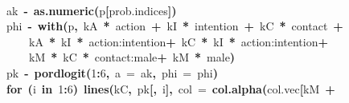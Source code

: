 \documentclass{article}
\makeatletter
\newcommand{\hlnumber}[1]{\textcolor[rgb]{0,0,0}{#1}}%
\newcommand{\hlfunctioncall}[1]{\textcolor[rgb]{.5,0,.33}{\textbf{#1}}}%
\newcommand{\hlkeyword}[1]{\textbf{#1}}%
\newcommand{\hlargument}[1]{\textcolor[rgb]{.69,.25,.02}{#1}}%
\newcommand{\hlassignement}[1]{\textbf{#1}}%
\newcommand{\hlsymbol}[1]{#1}%
\newcommand{\hlstd}[1]{\textcolor[rgb]{0,0,0}{#1}}%
\newenvironment{kframe}{%
 \def\FrameCommand##1{\hskip\@totalleftmargin \hskip-\fboxsep
 \colorbox{shadecolor}{##1}\hskip-\fboxsep
     \hskip-\linewidth \hskip-\@totalleftmargin \hskip\columnwidth}%
 \MakeFramed {\advance\hsize-\width
   \@totalleftmargin\z@ \linewidth\hsize
   \@setminipage}}%
 {\par\unskip\endMakeFramed}
\newenvironment{knitrout}{}{} %
\makeatother
\begin{document}
\begin{knitrout}
{\begin{kframe}
\begin{flushleft}
\hlstd{}\hspace*{\fill}\\
\hlstd{}{\ }{\ }{\ }{\ }{\ }{\ }{\ }{\ }\hlsymbol{ak}{\ }\hlassignement{\usebox{\hlnormalsizeboxlessthan}-}{\ }\hlfunctioncall{as.numeric}\hlkeyword{(}\hlsymbol{p}\hlkeyword{[}\hlsymbol{prob.indices}\hlkeyword{]}\hlkeyword{)}\hspace*{\fill}\\
\hlstd{}{\ }{\ }{\ }{\ }{\ }{\ }{\ }{\ }\hlsymbol{phi}{\ }\hlassignement{\usebox{\hlnormalsizeboxlessthan}-}{\ }\hlfunctioncall{with}\hlkeyword{(}\hlsymbol{p}\hlkeyword{,}{\ }\hlsymbol{kA}{\ }\hlkeyword{*}{\ }\hlsymbol{action}{\ }\hlkeyword{+}{\ }\hlsymbol{kI}{\ }\hlkeyword{*}{\ }\hlsymbol{intention}{\ }\hlkeyword{+}{\ }\hlsymbol{kC}{\ }\hlkeyword{*}{\ }\hlsymbol{contact}{\ }\hlkeyword{+}\hspace*{\fill}\\
\hlstd{}{\ }{\ }{\ }{\ }{\ }{\ }{\ }{\ }{\ }{\ }{\ }{\ }\hlsymbol{kA}{\ }\hlkeyword{*}{\ }\hlsymbol{kI}{\ }\hlkeyword{*}{\ }\hlsymbol{\usebox{\hlnormalsizeboxbacktick}action:intention\usebox{\hlnormalsizeboxbacktick}}{\ }\hlkeyword{+}{\ }\hlsymbol{kC}{\ }\hlkeyword{*}{\ }\hlsymbol{kI}{\ }\hlkeyword{*}{\ }\hlsymbol{\usebox{\hlnormalsizeboxbacktick}action:intention\usebox{\hlnormalsizeboxbacktick}}{\ }\hlkeyword{+}\hspace*{\fill}\\
\hlstd{}{\ }{\ }{\ }{\ }{\ }{\ }{\ }{\ }{\ }{\ }{\ }{\ }\hlsymbol{kM}{\ }\hlkeyword{*}{\ }\hlsymbol{kC}{\ }\hlkeyword{*}{\ }\hlsymbol{\usebox{\hlnormalsizeboxbacktick}contact:male\usebox{\hlnormalsizeboxbacktick}}{\ }\hlkeyword{+}{\ }\hlsymbol{kM}{\ }\hlkeyword{*}{\ }\hlsymbol{male}\hlkeyword{)}\hspace*{\fill}\\
\hlstd{}{\ }{\ }{\ }{\ }{\ }{\ }{\ }{\ }\hlsymbol{pk}{\ }\hlassignement{\usebox{\hlnormalsizeboxlessthan}-}{\ }\hlfunctioncall{pordlogit}\hlkeyword{(}\hlnumber{1}\hlkeyword{:}\hlnumber{6}\hlkeyword{,}{\ }\hlargument{a}{\ }\hlargument{=}{\ }\hlsymbol{ak}\hlkeyword{,}{\ }\hlargument{phi}{\ }\hlargument{=}{\ }\hlsymbol{phi}\hlkeyword{)}\hspace*{\fill}\\
\hlstd{}{\ }{\ }{\ }{\ }{\ }{\ }{\ }{\ }\hlkeyword{for}{\ }\hlkeyword{(}\hlsymbol{i}{\ }\hlkeyword{in}{\ }\hlnumber{1}\hlkeyword{:}\hlnumber{6}\hlkeyword{)}{\ }\hlfunctioncall{lines}\hlkeyword{(}\hlsymbol{kC}\hlkeyword{,}{\ }\hlsymbol{pk}\hlkeyword{[}\hlkeyword{,}{\ }\hlsymbol{i}\hlkeyword{]}\hlkeyword{,}{\ }\hlargument{col}{\ }\hlargument{=}{\ }\hlfunctioncall{col.alpha}\hlkeyword{(}\hlsymbol{col.vec}\hlkeyword{[}\hlsymbol{kM}{\ }\hlkeyword{+}\hspace*{\fill}\\

\end{flushleft}
\end{kframe}}
\end{knitrout}
\end{document}
